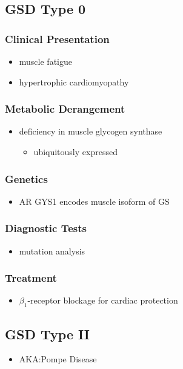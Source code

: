 \documentclass{scrartcl}
\begin{document}
\subsection{GSD Type 0}
\label{sec:org83630d3}
\subsubsection{Clinical Presentation}
\label{sec:org68c5efe}
\begin{itemize}
\item muscle fatigue
\item hypertrophic cardiomyopathy
\end{itemize}
\subsubsection{Metabolic Derangement}
\label{sec:orge99c1b9}
\begin{itemize}
\item deficiency in muscle glycogen synthase
\begin{itemize}
\item ubiquitously expressed
\end{itemize}
\end{itemize}
\subsubsection{Genetics}
\label{sec:org377488c}
\begin{itemize}
\item AR GYS1 encodes muscle isoform of GS
\end{itemize}
\subsubsection{Diagnostic Tests}
\label{sec:orge4daea2}
\begin{itemize}
\item mutation analysis
\end{itemize}
\subsubsection{Treatment}
\label{sec:orgb9c212f}
\begin{itemize}
\item \(\beta_{\text{1}}\)-receptor blockage for cardiac protection
\end{itemize}
\subsection{GSD Type II}
\label{sec:org18e48f3}
\begin{itemize}
\item AKA:Pompe Disease
\end{itemize}
\end{document}
